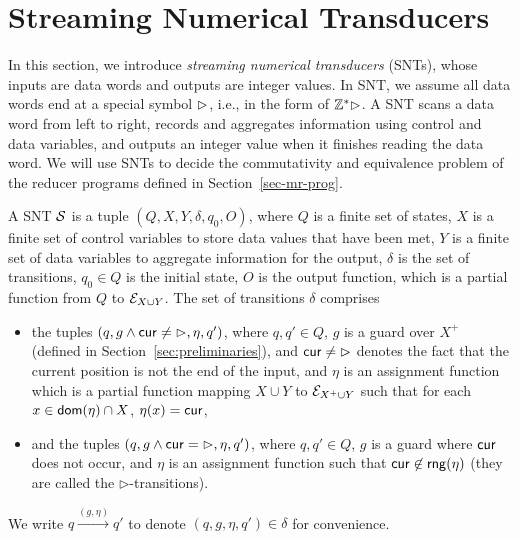 


\section{Streaming Numerical Transducers}\label{sec:def-snt}

In this section, we introduce \emph{streaming numerical transducers} (SNTs), whose inputs are data words and outputs are integer values. 
In SNT, we assume all data words end at a special symbol $\rhd$, i.e., in the form of ${\mathbb{Z} }^*\rhd$.
A SNT scans a data word from left to right, records and aggregates information using control and data variables, and outputs an integer value when it finishes reading the data word. We will use SNTs to decide the commutativity and equivalence problem of the reducer programs defined in Section~\ref{sec-mr-prog}. 


A SNT ${\mathcal{S} }$ is a tuple $(Q, X, Y, \delta, q_0, O)$, where $Q$ is a finite set of states, $X$ is a finite set of control variables to store data values that have been met, $Y$ is a finite set of data variables to aggregate information for the output, $\delta$ is the set of transitions, $q_0 \in Q$ is the initial state, $O$ is the output function, which is a partial function from $Q$ to ${\mathcal{E} }_{X \cup Y}$.
The set of transitions $\delta$ comprises 
\begin{itemize}
\item the tuples $(q,  g \wedge \mathsf{cur} \neq \rhd, \eta, q')$, where $q,q'\in Q$, $g$ is a guard over $X^+$ (defined in Section~\ref{sec:preliminaries}), and $\mathsf{cur} \neq \rhd$ denotes the fact that the current position is not the end of the input,  and $\eta$ is an assignment function which is a partial function mapping $X \cup Y$  to ${\mathcal{E} }_{X^+ \cup Y}$ such that for each $x \in \mathsf{dom}(\eta) \cap X$, $\eta(x)=\mathsf{cur}$,
%
\item and the tuples $(q, g \wedge \mathsf{cur} = \rhd, \eta, q')$, where $q,q' \in Q$, $g$ is a guard where $\mathsf{cur}$ does not occur, and $\eta$ is an assignment function such that $\mathsf{cur} \not \in \mathsf{rng}(\eta)$ (they are called the $\triangleright$-transitions).
\end{itemize}
We write $q \xrightarrow{(g,\eta)} q'$ to denote $(q,g,\eta,q') \in \delta$ for convenience.  

